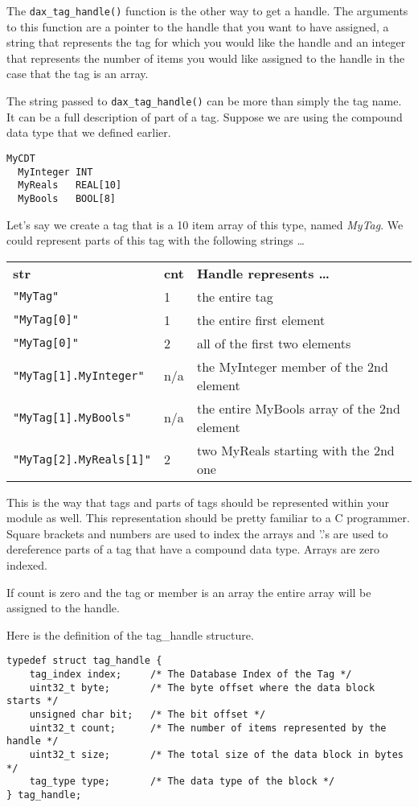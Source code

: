 The \verb|dax_tag_handle()| function  is the other way to get a handle.  The arguments to this function are a pointer to the handle that you want to have assigned, a string that represents the tag for which you would like the handle and an integer that represents the number of items you would like assigned to the handle in the case that the tag is an array.

The string passed to \verb|dax_tag_handle()| can be more than simply the tag name.  It can be a full description of part of a tag.  Suppose we are using the compound data type that we defined earlier.

\begin{verbatim}
MyCDT
  MyInteger INT
  MyReals   REAL[10]
  MyBools   BOOL[8]
\end{verbatim}

Let's say we create a tag that is a 10 item array of this type, named \emph{MyTag}.  We could represent parts of this tag with the following strings \ldots

\begin{tabular}{lll}
\textbf{str} & \textbf{cnt} & \textbf{Handle represents \ldots} \\
\verb|"MyTag"| & 1 & the entire tag \\
\verb|"MyTag[0]"| & 1 & the entire first element \\
\verb|"MyTag[0]"| & 2 & all of the first two elements \\
\verb|"MyTag[1].MyInteger"| & n/a & the MyInteger member of the 2nd element \\
\verb|"MyTag[1].MyBools"| & n/a & the entire MyBools array of the 2nd element \\
\verb|"MyTag[2].MyReals[1]"| & 2 & two MyReals starting with the 2nd one \\
\end{tabular}

This is the way that tags and parts of tags should be represented within your module as well.  This representation should be pretty familiar to a C programmer.  Square brackets and numbers are used to index the arrays and '.'s are used to dereference parts of a tag that have a compound data type.  Arrays are zero indexed.

If count is zero and the tag or member is an array the entire array will be assigned to the handle.

Here is the definition of the tag\_handle structure.

\begin{verbatim}
typedef struct tag_handle {
	tag_index index;     /* The Database Index of the Tag */
	uint32_t byte;       /* The byte offset where the data block starts */
	unsigned char bit;   /* The bit offset */
	uint32_t count;      /* The number of items represented by the handle */
	uint32_t size;       /* The total size of the data block in bytes */
	tag_type type;       /* The data type of the block */
} tag_handle;
\end{verbatim}


